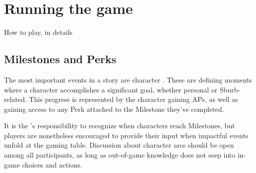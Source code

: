 \chapter{Running the game}

How to play, in details

\section{Milestones and Perks}

The most important events in a \ParadoxSpaceRPG{} story are character .
These are defining moments where a character accomplishes a significant goal, whether personal or Sburb-related.
This progress is represented by the character gaining APs, as well as gaining access to any Perk attached to
the Milestone they've completed.

It is the \GM's responsibility to recognize when characters reach Milestones, but players are nonetheless
encouraged to provide their input when impactful events unfold at the gaming table. Discussion about character
arcs should be open among all participants, as long as out-of-game knowledge does not seep into in-game choices
and actions.
